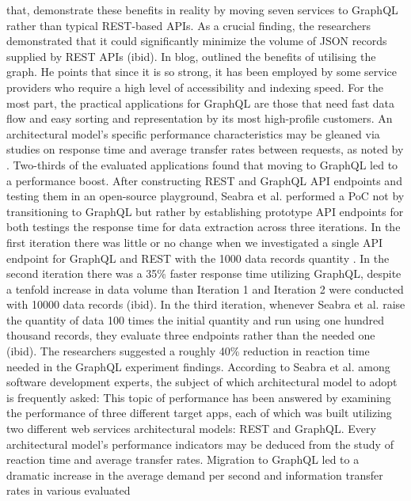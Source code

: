 that, \citet{britoMigratingGraphQLPractical2019} demonstrate these benefits in
reality by moving seven services to GraphQL rather than typical REST-based APIs.
As a crucial finding, the researchers demonstrated that it could significantly
minimize the volume of JSON records supplied by REST APIs (ibid). In blog,
\citet{kristopherUniqueBenefitsUsing2018} outlined the benefits of utilising the
graph. He points that since it is so strong, it has been employed by some
service providers who require a high level of accessibility and indexing speed.
For the most part, the practical applications for GraphQL are those that need
fast data flow and easy sorting and representation by its most high-profile
customers. An architectural model's specific performance characteristics may be
gleaned via studies on response time and average transfer rates between requests,
as noted by \citet{seabraRESTGraphQLPerformance2019}. Two-thirds of the
evaluated applications found that moving to GraphQL led to a performance boost.
After constructing REST and GraphQL API endpoints and testing them in an
open-source playground, Seabra et al. performed a PoC not by transitioning to
GraphQL but rather by establishing prototype API endpoints for both testings the
response time for data extraction across three iterations. In the first
iteration there was little or no change when we investigated a single API
endpoint for GraphQL and REST with the 1000 data records quantity
\citep{seabraRESTGraphQLPerformance2019}. In the second iteration there was a
35\% faster response time utilizing GraphQL, despite a tenfold increase in data
volume than Iteration 1 and Iteration 2 were conducted with 10000 data records
(ibid). In the third iteration, whenever Seabra et al. raise the quantity of
data 100 times the initial quantity and run using one hundred thousand records,
they evaluate three endpoints rather than the needed one (ibid). The researchers
suggested a roughly 40\% reduction in reaction time needed in the GraphQL
experiment findings. According to Seabra et al. among software development
experts, the subject of which architectural model to adopt is frequently asked:
This topic of performance has been answered by examining the performance of
three different target apps, each of which was built utilizing two different web
services architectural models: REST and GraphQL. Every architectural model's
performance indicators may be deduced from the study of reaction time and
average transfer rates. Migration to GraphQL led to a dramatic increase in the
average demand per second and information transfer rates in various evaluated
